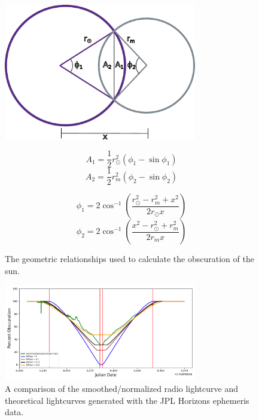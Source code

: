 \begin{figure}
\begin{minipage}{0.49\textwidth}
  \includegraphics[width=0.75\textwidth]{figures/drawing}
  \caption{\label{fig:eclipse_geometry} The geometric relationships used to calculate the obscuration of the sun.}
\end{minipage}
\hfill
\begin{minipage}{0.49\textwidth}
\begin{equation}
  A_1 = \frac{1}{2}r_{\odot}^2\left(\phi_1 - \sin\phi_1\right)
\end{equation}
\begin{equation}
  A_2 = \frac{1}{2}r_{m}^2\left(\phi_2 - \sin\phi_2\right)
\end{equation}

\begin{equation}
  \phi_1 = 2\cos^{-1}\left(\frac{r_{\odot}^2 - r_{m}^2+x^2}{2r_{\odot}x}\right)
\end{equation}
\begin{equation}
  \phi_2 = 2\cos^{-1}\left(\frac{x^2 - r_{\odot}^2 + r_{m}^2}{2r_{m}x}\right)
\end{equation}
\end{minipage}
\end{figure}



\begin{figure}
  \includegraphics[width=0.75\textwidth]{figures/RadiovsTheoretical}
  \caption{\label{fig:RadiovsTheoretical} A comparison of the smoothed/normalized radio lightcurve and theoretical lightcurves generated with the JPL Horizons ephemeris data.}
\end{figure}

